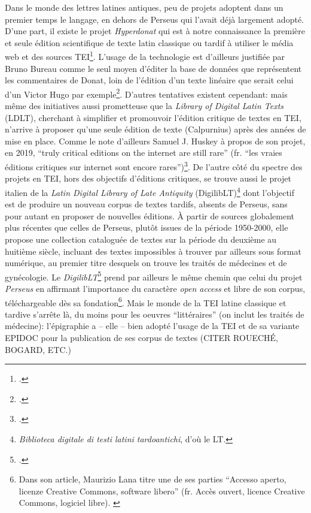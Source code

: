Dans le monde des lettres latines antiques, peu de projets adoptent dans un premier temps le langage, en dehors de Perseus qui l'avait déjà largement adopté.  D'une part, il existe le projet \textit{Hyperdonat} qui est à notre connaissance la première et seule édition scientifique de texte latin classique ou tardif à utiliser le média web et des sources TEI\footcite{bureau2008hyperdonat}. L'usage de la technologie est d'ailleurs justifiée par Bruno Bureau comme le seul moyen d'éditer la base de données que représentent les commentaires de Donat, loin de l'édition d'un texte linéaire que serait celui d'un Victor Hugo par exemple\footcite{chaire_de_recherche_sur_les_ecritures_numeriques_exemple_2018}. D'autres tentatives existent cependant: mais même des initiatives aussi prometteuse que la \textit{Library of Digital Latin Texts} (LDLT), cherchant à simplifier et promouvoir l'édition critique de textes en TEI, n'arrive à proposer qu'une seule édition de texte (Calpurnius) après des années de mise en place. Comme le note d'ailleurs Samuel J. Huskey à propos de son projet, en 2019, ``truly critical editions on the internet are still rare'' (fr. ``les vraies éditions critiques sur internet sont encore rares'')\footcite{huskey_digital_2019}. De l'autre côté du spectre des projets en TEI, hors des objectifs d'éditions critiques, se trouve aussi le projet italien de la  \textit{Latin Digital Library of Late Antiquity} (DigilibLT)\footnote{\textit{Biblioteca digitale di testi latini tardoantichi}, d'où le LT.} dont l'objectif est de produire un nouveau corpus de textes tardifs, absents de Perseus, sans pour autant en proposer de nouvelles éditions. À partir de sources globalement plus récentes que celles de Perseus, plutôt issues de la période 1950-2000, elle propose une collection cataloguée de textes sur la période du deuxième au huitième siècle, incluant des textes impossibles à trouver par ailleurs sous format numérique, au premier titre desquels on trouve les traités de médecines et de gynécologie. Le \textit{DigilibLT}\footcite{lana_metodologie_2012} prend par ailleurs le même chemin que celui du projet \textit{Perseus} en affirmant l'importance du caractère \textit{open access} et libre de son corpus, téléchargeable dès sa fondation\footnote{Dans son article, Maurizio Lana titre une de ses parties ``Accesso aperto, licenze Creative Commons, software libero'' (fr. Accès ouvert, licence Creative Commons, logiciel libre). \cite{lana_metodologie_2012}}. Mais le monde de la TEI latine classique et tardive s'arrête là, du moins pour les oeuvres ``littéraires'' (on inclut les traités de médecine): l'épigraphie a -- elle -- bien adopté l'usage de la TEI et de sa variante EPIDOC pour la publication de ses corpus de textes (CITER ROUECHÉ, BOGARD, ETC.)


